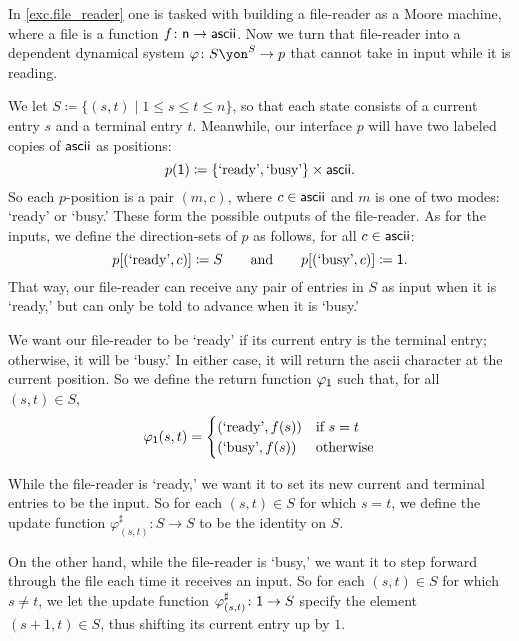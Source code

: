 \documentclass[Book-Poly]{subfiles}
\begin{document}
\begin{example}\label{ex.generalized_file_reader}
In \cref{exc.file_reader} one is tasked with building a file-reader as a Moore machine, where a file is a function $f\colon\mathsf{n}\to\mathsf{ascii}$. 
Now we turn that file-reader into a dependent dynamical system $\varphi\colon S\yon^S\to p$ that cannot take in input while it is reading.

We let $S \coloneqq \{(s,t)\mid 1\leq s\leq t\leq n\}$, so that each state consists of a current entry $s$ and a terminal entry $t$.
Meanwhile, our interface $p$ will have two labeled copies of $\mathsf{ascii}$ as positions:
\[
    p(\textsf{1})\coloneqq\{\text{`ready'}, \text{`busy'}\}\times\mathsf{ascii}.
\]
So each $p$-position is a pair $(m,c)$, where $c\in\mathsf{ascii}$ and $m$ is one of two modes: `ready' or `busy.'
These form the possible outputs of the file-reader.
As for the inputs, we define the direction-sets of $p$ as follows, for all $c\in\mathsf{ascii}$:
\[
    p[(\text{`ready'}, c)]\coloneqq S \qquad\text{and}\qquad p[(\text{`busy'}, c)]\coloneqq\textsf{1}.
\]
That way, our file-reader can receive any pair of entries in $S$ as input when it is `ready,' but can only be told to advance when it is `busy.'

We want our file-reader to be `ready' if its current entry is the terminal entry; otherwise, it will be `busy.'
In either case, it will return the ascii character at the current position.
So we define the return function $\varphi_{\textsf{1}}$ such that, for all $(s,t)\in S$,
\begin{align*}
  \varphi_{\textsf{1}}(s, t) =
  \begin{cases}
    (\text{`ready'}, f(s)) &\mbox{if $s = t$}\\
    (\text{`busy'}, f(s)) &\mbox{otherwise}  
  \end{cases}
\end{align*}

While the file-reader is `ready,' we want it to set its new current and terminal entries to be the input.
So for each $(s,t)\in S$ for which $s=t$, we define the update function $\varphi^\sharp_{(s,t)}\colon S\to S$ to be the identity on $S$.

On the other hand, while the file-reader is `busy,' we want it to step forward through the file each time it receives an input.
So for each $(s,t)\in S$ for which $s\neq t$, we let the update function $\varphi^\sharp_{(s,t)}\colon \textsf{1}\to S$ specify the element $(s+1, t)\in S$, thus shifting its current entry up by $1$.
\end{example}
\end{document}

